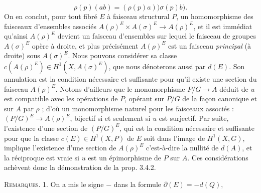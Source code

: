 \[
\rho(p)(ab)=(\rho(p)a))\sigma(p)b).
\]
On en conclut, pour tout fibré $E$ à faisceau structural $P$, un homomorphisme
des faisceaux d'ensembles associés
$A(\rho)^E\times A(\sigma)^E\to A(\rho)^E$,
et il est immédiat qu'ainsi $A(\rho)^E$ devient un faisceau d'ensembles sur
lequel le faisceau de groupes $A(\sigma)^E$ opère à droite, et plus précisément
$A(\rho)^E$ est un faisceau \textit{principal} (à droite) sous $A(\sigma)^E$.
Nous pouvons considérer sa classe
$c(A(\rho)^E)\in H^1(X,A(\sigma)^E)$,
que nous dénoterons aussi par $d(E)$. Son annulation est la condition nécessaire
et suffisante pour qu'il existe une section du faisceau $A(\rho)^E$. Notons
d'ailleurs que le monomorphisme $P/G\to A$ déduit de $u$ est
compatible avec les opérations de $P$, opérant sur $P/G$ de la façon canonique
et sur $A$ par $\rho$ ; d'où un monomorphisme naturel pour les faisceaux
associés :
$(P/G)^E\to A(\rho)^E$,
bijectif si et seulement si $u$ est surjectif.
Par suite, l'existence d'une section de $(P/G)^E$, qui est la condition
nécessaire et suffisante pour que la classe $c(E)\in H^1(X,P)$ de $E$ soit
dans l'image de $H^1(X,G)$, implique l'existence d'une section de $A(\rho)^E$
c'est-à-dire la nullité de $d(A)$, et la réciproque est vraie si $u$ est un
épimorphisme de $P$ sur $A$. Ces considérations achèvent donc la démonstration
de la prop. 3.4.2.

\indent\textsc{Remarques.} 1. On a mis le signe $-$ dans la formule
$\partial(E)=-d(Q)$,

